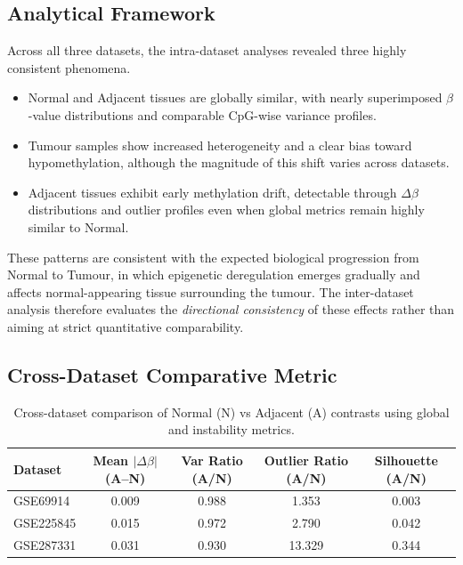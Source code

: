 \subsection{Analytical Framework}

Across all three datasets, the intra-dataset analyses revealed three highly consistent phenomena.

\begin{itemize}[label=--]
    \item Normal and Adjacent tissues are globally similar, with nearly superimposed $\beta$-value distributions and
    comparable CpG-wise variance profiles.
    \item Tumour samples show increased heterogeneity and a clear bias toward hypomethylation, although the magnitude
    of this shift varies across datasets.
    \item Adjacent tissues exhibit early methylation drift, detectable through $\Delta\beta$ distributions and outlier 
    profiles even when global metrics remain highly similar to Normal.
\end{itemize}

These patterns are consistent with the expected biological progression from Normal to Tumour, in which epigenetic 
deregulation emerges gradually and affects normal-appearing tissue surrounding the tumour.  
The inter-dataset analysis therefore evaluates the \textit{directional consistency} of these effects rather than aiming 
at strict quantitative comparability.

\subsection{Cross-Dataset Comparative Metric}

\begin{table}[t]
\centering
\caption{Cross-dataset comparison of Normal (N) vs Adjacent (A) contrasts using global and instability metrics.}
\label{tab:inter_summary_NA}
\scriptsize
\begin{tabular}{lcccc}
\toprule
\textbf{Dataset} &
\textbf{Mean $|\Delta\beta|$ (A--N)} &
\textbf{Var Ratio (A/N)} &
\textbf{Outlier Ratio (A/N)} &
\textbf{Silhouette (A/N)} \\
\midrule
GSE69914 &
0.009 &
0.988 &
1.353 &
0.003 \\
GSE225845 &
0.015 &
0.972 &
2.790 &
0.042 \\
GSE287331 &
0.031 &
0.930 &
13.329 &
0.344 \\
\bottomrule
\end{tabular}
\end{table}


